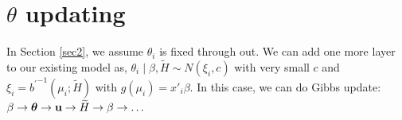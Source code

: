 \documentclass[10pt, oneside]{article}   	%
\renewcommand{\th}{\theta}
\newcommand{\thh}{\widetilde{H}}
\newcommand{\bth}{\mbox{\boldmath $\theta$}}
\begin{document}
\section[]{$\theta$ updating}
In Section \ref{sec2}, we assume $\th_i$ is fixed through out. We can add one more layer to our existing model as, $\theta_i \mid \beta, \thh \sim N(\xi_i, c)$ with very small $c$ and $\xi_i = {b^\prime}^{-1}(\mu_i; \thh)$ with $g(\mu_i) = x'_i\beta$. In this case, we can do Gibbs update: $\beta \to \bth \to \mathbf{u} \to \thh \to \beta \to \dots$
\end{document}
